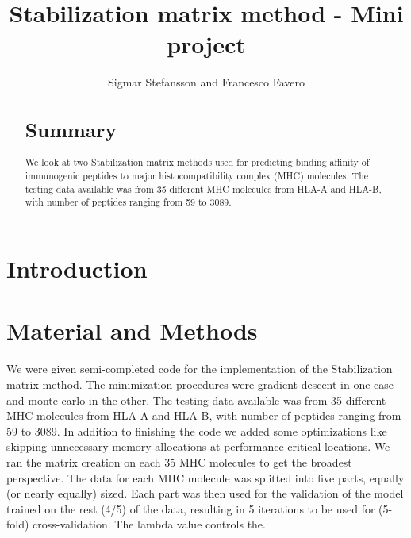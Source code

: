 \documentclass{bioinfo}
\begin{document}
\begin{application}

\title[SMM Project]{Stabilization matrix method - Mini project}
\author[Sigmar Stefansson, Francesco Favero]{Sigmar Stefansson and Francesco Favero}
\address{Danmarks Tekniske Univeristet}



\maketitle

\begin{abstract}

\section{Summary}
We look at two Stabilization matrix methods \cite{SMM} used for predicting binding affinity of immunogenic peptides to major histocompatibility complex \cite{wiki:MHC} (MHC) molecules.
The testing data available was from 35 different MHC molecules from HLA-A and HLA-B, with number of peptides ranging from 59 to 3089.

\end{abstract}

\section*{Introduction}

\section*{Material and Methods}

We were given semi-completed code for the implementation of the Stabilization matrix method. The minimization procedures were gradient descent in one case and monte carlo in the other. The testing data available was from 35 different MHC molecules from HLA-A and HLA-B, with number of peptides ranging from 59 to 3089. In addition to finishing the code we added some optimizations like skipping unnecessary memory allocations at performance critical locations. We ran the matrix creation on each 35 MHC molecules to get the broadest perspective.
The data for each MHC molecule was splitted into five parts, equally (or nearly equally) sized. Each part was then used for the validation of the model trained on the rest (4/5) of the data, resulting in 5 iterations to be used for (5-fold) cross-validation.
The lambda value controls the.




\end{application}
\end{document}
